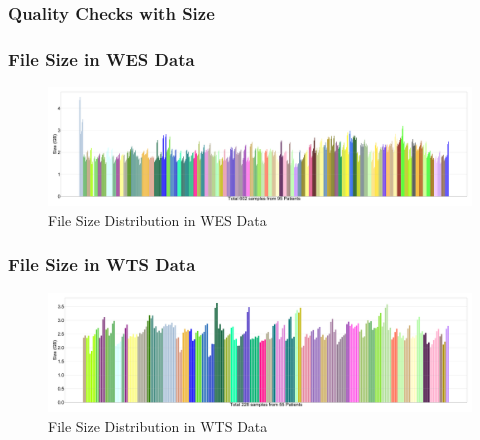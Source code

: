 \documentclass{beamer}
\begin{document}
    \subsubsection{Quality Checks with Size}
    \begin{frame}
        \frametitle{File Size in WES Data}

        \begin{figure}
            \includegraphics[width=\linewidth]{figures/Size/WES.pdf}
            \caption{File Size Distribution in WES Data}
        \end{figure}
    \end{frame}

    \begin{frame}
        \frametitle{File Size in WTS Data}

        \begin{figure}
            \includegraphics[width=\linewidth]{figures/Size/WTS.pdf}
            \caption{File Size Distribution in WTS Data}
        \end{figure}
    \end{frame}
\end{document}

